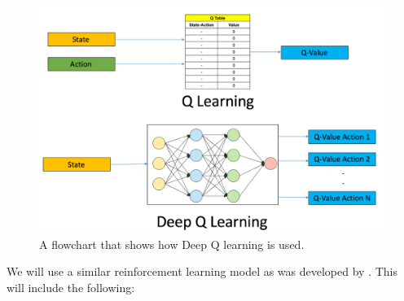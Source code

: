 \documentclass{article} %
\begin{document}
\begin{figure}[!htbp]
\begin{center}
\includegraphics[width=1.0\textwidth]{Figs/QLearn_img.png}
\end{center}
\caption{A flowchart that shows how Deep Q learning is used.}
\label{fig:Deep_Q_Learn}
\end{figure}

We will use a similar reinforcement learning model as was developed by 
\cite{Playing+Atari+with+Deep+Reinforcement+Learning}. This will include
the following:
\end{document}
